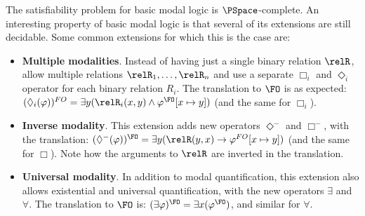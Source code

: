 The satisfiability problem for basic modal logic is $\PSpace$-complete\cite{ladner1977}.
An interesting property of basic modal logic is that several of its extensions are still decidable.
Some common extensions for which this is the case are:
\begin{itemize}
  \item
        \textbf{Multiple modalities}.
        Instead of having just a single binary relation $\relR$, allow multiple relations $\relR_1, \ldots, \relR_{n}$ and use a separate $\Box_{i}$ and $\Diamond_{i}$ operator for each binary relation $R_{i}$.
        The translation to $\FO$ is as expected: $(\Diamond_{i}(\varphi))^{FO} = \exists{y}(\relR_{i}(x,y) \land \varphi^{\FO}[x \mapsto y])$ (and the same for $\Box_{i}$).
  \item
        \textbf{Inverse modality}.
        This extension adds new operators $\Diamond^{-}$ and $\Box^{-}$, with the translation: $(\Diamond^{-}(\varphi))^{\FO} = \exists{y}(\relR(y,x) \to \varphi^{FO}[x \mapsto y])$ (and the same for $\Box$).
        Note how the arguments to $\relR$ are inverted in the translation.
  \item
        \textbf{Universal modality}.
        In addition to modal quantification, this extension also allows existential and universal quantification, with the new operators $\exists$ and $\forall$.
        The translation to $\FO$ is: $(\exists \varphi)^{\FO} = \exists{x}(\varphi^{\FO})$, and similar for $\forall$.
\end{itemize}
